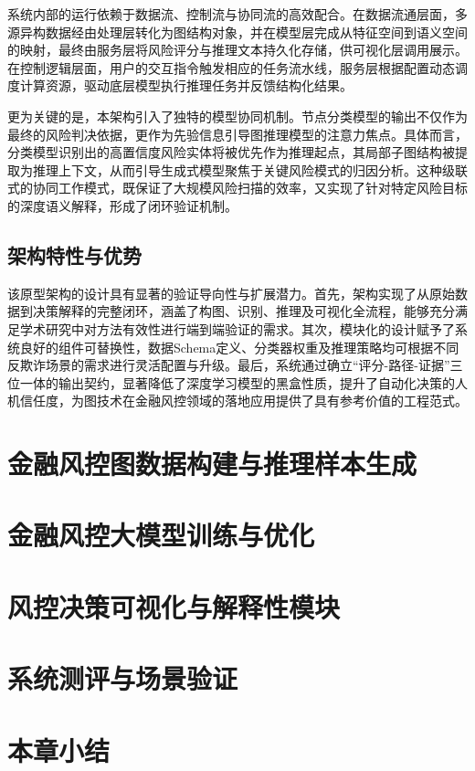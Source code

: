 系统内部的运行依赖于数据流、控制流与协同流的高效配合。在数据流通层面，多源异构数据经由处理层转化为图结构对象，并在模型层完成从特征空间到语义空间的映射，最终由服务层将风险评分与推理文本持久化存储，供可视化层调用展示。在控制逻辑层面，用户的交互指令触发相应的任务流水线，服务层根据配置动态调度计算资源，驱动底层模型执行推理任务并反馈结构化结果。

更为关键的是，本架构引入了独特的模型协同机制。节点分类模型的输出不仅作为最终的风险判决依据，更作为先验信息引导图推理模型的注意力焦点。具体而言，分类模型识别出的高置信度风险实体将被优先作为推理起点，其局部子图结构被提取为推理上下文，从而引导生成式模型聚焦于关键风险模式的归因分析。这种级联式的协同工作模式，既保证了大规模风险扫描的效率，又实现了针对特定风险目标的深度语义解释，形成了闭环验证机制。

\subsection{架构特性与优势}

该原型架构的设计具有显著的验证导向性与扩展潜力。首先，架构实现了从原始数据到决策解释的完整闭环，涵盖了构图、识别、推理及可视化全流程，能够充分满足学术研究中对方法有效性进行端到端验证的需求。其次，模块化的设计赋予了系统良好的组件可替换性，数据Schema定义、分类器权重及推理策略均可根据不同反欺诈场景的需求进行灵活配置与升级。最后，系统通过确立“评分-路径-证据”三位一体的输出契约，显著降低了深度学习模型的黑盒性质，提升了自动化决策的人机信任度，为图技术在金融风控领域的落地应用提供了具有参考价值的工程范式。
\section{金融风控图数据构建与推理样本生成}

\section{金融风控大模型训练与优化}
\section{风控决策可视化与解释性模块}
\section{系统测评与场景验证}
\section{本章小结}

